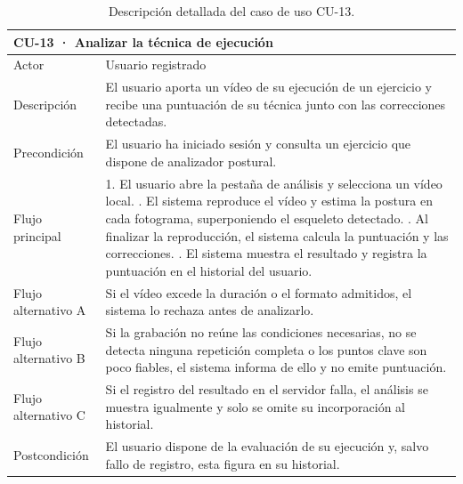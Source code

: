 \documentclass[12pt,a4paper,twoside,openright]{book}
\begin{document}
    \begin{table}[htbp]
        \centering
        \small
        \begin{tabular}{p{2.7cm} p{9.8cm}}
            \toprule
            \multicolumn{2}{l}{\textbf{CU-13 · Analizar la técnica de ejecución}} \\
            \midrule
            Actor & Usuario registrado \\
            Descripción & El usuario aporta un vídeo de su ejecución de un ejercicio y recibe una puntuación de su técnica junto con las correcciones detectadas. \\
            Precondición & El usuario ha iniciado sesión y consulta un ejercicio que dispone de analizador postural. \\
            Flujo principal & 1. El usuario abre la pestaña de análisis y selecciona un vídeo local. \newline
                              2. El sistema reproduce el vídeo y estima la postura en cada fotograma, superponiendo el esqueleto detectado. \newline
                              3. Al finalizar la reproducción, el sistema calcula la puntuación y las correcciones. \newline
                              4. El sistema muestra el resultado y registra la puntuación en el historial del usuario. \\
            Flujo alternativo A & Si el vídeo excede la duración o el formato admitidos, el sistema lo rechaza antes de analizarlo. \\
            Flujo alternativo B & Si la grabación no reúne las condiciones necesarias, no se detecta ninguna repetición completa o los puntos clave son poco fiables, el sistema informa de ello y no emite puntuación. \\
            Flujo alternativo C & Si el registro del resultado en el servidor falla, el análisis se muestra igualmente y solo se omite su incorporación al historial. \\
            Postcondición & El usuario dispone de la evaluación de su ejecución y, salvo fallo de registro, esta figura en su historial. \\
            \bottomrule
        \end{tabular}
        \caption{Descripción detallada del caso de uso CU-13.}
        \label{tab:cu-13}
    \end{table}


\end{document}
